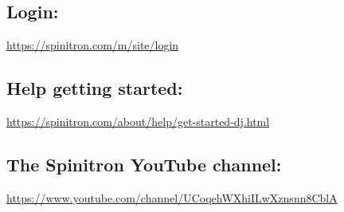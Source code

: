 \documentclass[12pt]{article}
\begin{document}
\subsection{Login:}

\url{https://spinitron.com/m/site/login}

\subsection{Help getting started:}

\url{https://spinitron.com/about/help/get-started-dj.html}

\subsection{The Spinitron YouTube channel:}

\url{https://www.youtube.com/channel/UCoqehWXhiILwXznsnn8CblA}





\newpage

\listoffigures
\end{document}
